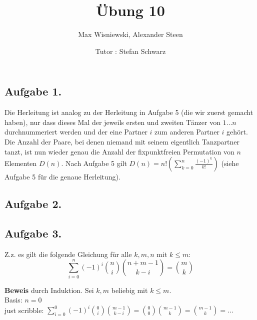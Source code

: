 \documentclass[11pt,a4paper,ngerman]{article}
\date{Tutor : Stefan Schwarz}
\title{Übung 10}
\author{Max Wisniewski, Alexander Steen}
\begin{document}

\renewcommand{\figurename}{Figure}

\maketitle
\thispagestyle{fancy}

\subsection*{Aufgabe 1.}
Die Herleitung ist analog zu der Herleitung in Aufgabe 5 (die wir zuerst gemacht haben), nur dass dieses Mal der jeweils ersten und zweiten Tänzer von $1 \ldots n$ durchnummeriert werden und der eine Partner $i$ zum anderen Partner $i$ gehört. Die Anzahl der Paare, bei denen niemand mit seinem eigentlich Tanzpartner tanzt, ist nun wieder genau die Anzahl der fixpunktfreien Permutation von $n$ Elementen $D(n)$. Nach Aufgabe 5 gilt
$D(n) = n! \left(\sum_{k=0}^n \frac{ (-1)^{k} }{k!} \right)$ (siehe Aufgabe 5 für die genaue Herleitung).
\subsection*{Aufgabe 2.}

\subsection*{Aufgabe 3.}
Z.z. es gilt die folgende Gleichung für alle $k,m,n$ mit $k \leq m$:
\begin{equation*}
  \sum_{i=0}^n (-1)^i  \binom{n}{i} \binom{n+m-1}{k-i} = \binom{m}{k}
\end{equation*}

\textbf{Beweis} durch Induktion. Sei $k,m$ beliebig mit $k \leq m$.\\
Basis: $n = 0$ \\
just scribble:
$\sum_{i=0}^0 (-1)^i  \binom{0}{i} \binom{m-1}{k-i} = \binom{0}{0} \binom{m-1}{k} = \binom{m-1}{k} = ...$
\end{document}

